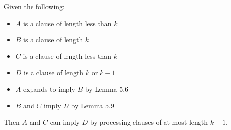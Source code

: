 \documentclass[manuscript]{acmart}
\begin{document}
    \begin{lemma}
        Given the following:
        \begin{itemize}
            \item $A$ is a clause of length less than $k$
            \item $B$ is a clause of length $k$
            \item $C$ is a clause of length less than $k$
            \item $D$ is a clause of length $k$ or $k - 1$
            \item $A$ expands to imply $B$ by Lemma 5.6
            \item $B$ and $C$ imply $D$ by Lemma 5.9
        \end{itemize}
        Then $A$ and $C$ can imply $D$ by processing clauses of at 
        most length $k - 1$.
    \end{lemma}
\end{document}
